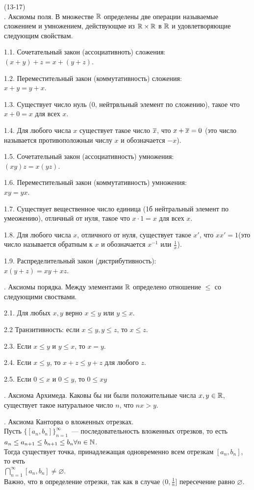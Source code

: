 (13-17)\\
. \q Аксиомы поля. В множестве $\mathbb{R}$ определены две операции называемые сложением и умножением, действующме из $\mathbb{R} \times \mathbb{R}$ в $\mathbb{R}$ и удовлетворяющие следующим свойствам.

1.1. Сочетательный закон (ассоциативноть) сложения:\\
$(x + y) + z = x + (y + z)$.

1.2. Переместительный закон (коммутативность) сложения:\\
$x + y = y + x$.

1.3. Существует число нуль (0, нейтрвльный элемент по сложению), такое что $x + 0 = x$ для всех $x$.

1.4. Для любого числа $x$ существует такое число $\overline{x}$, что $x + \overline{x} = 0$ (это число называется противоположныи числу $x$ и обозначается $-x$).

1.5. Сочетательный закон (ассоциативность) умножения:\\
$(xy)z = x(yz)$.

1.6. Переместительный закон (коммутативность) умножения:\\
$xy=yx$.

1.7. Существует вещественное число единица (1б нейтральный элемент по умеожению), отличный от нуля, такое что $x\cdot 1 = x$ для всех $x$.

1.8. Для любого числа $x$, отличного от нуля, существует такое $x'$, что $xx' = 1$(это число называется обратным к $x$ и обозначается $x^{-1}$ или $\frac{1}{x}$).

1.9. Распределительный закон (дистрибутивность):\\
$x(y + z) = xy + xz$.

. \q Аксиомы порядка. Между элементами $\mathbb{R}$ определено отношение $\le$ со следующими своствами.

2.1. Для любых $x, y$ верно $x \le y$ или $y \le x$.

2.2 Транзитивность: если $x \le y, y\le z$, то $x\le z$.

2.3. Если $x \le y$ и $y \le x$, то $x = y$.

2.4. Если $x \le y$, то $x + z \le y + z$ для любого $z$.

2.5. Если $0 \le x$ и $0 \le y$, то $0 \le xy$

. \q Аксиома Архимеда. Каковы бы ни были положительные числа $x, y \in \mathbb{R}$, существует такое натуральное число $n$, что $nx > y$.

. \q Аксиома Канторва о вложенных отрезках.\\
Пусть $\{[a_n, b_n]\}^\infty_{n = 1}$~--- последовательность вложенных отрезков, то есть\\
$a_n \le a_{n + 1} \le b_{n+1} \le b_n \forall n \in \mathbb{N}$.\\
Тогда существует точка, принадлежащая одновременно всем отрезкам $[a_n, b_n]$, то ечть\\
$\bigcap\limits^\infty_{n = 1} [a_n, b_n] \neq \varnothing$.\\
Важно, что в определение отрезки, так как в случае $(0, \frac{1}{n}]$ пересечение равно $\varnothing$.